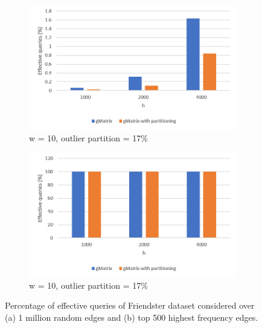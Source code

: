 \begin{figure}[!htbp]
\centering
\begin{subfigure}{.5\textwidth}
  \centering
  \includegraphics[width=1\linewidth]{F3}
  \caption{w = 10, outlier partition = 17\%}
  \label{fig:sub1}
\end{subfigure}%
\begin{subfigure}{.5\textwidth}
  \centering
  \includegraphics[width=1\linewidth]{F3T}
  \caption{w = 10, outlier partition = 17\%}
  \label{fig:sub2}
\end{subfigure}
\caption{Percentage of effective queries of Friendster dataset considered over (a) 1 million random edges and (b) top 500 highest frequency edges.}
\label{fig:f3}
\end{figure}

